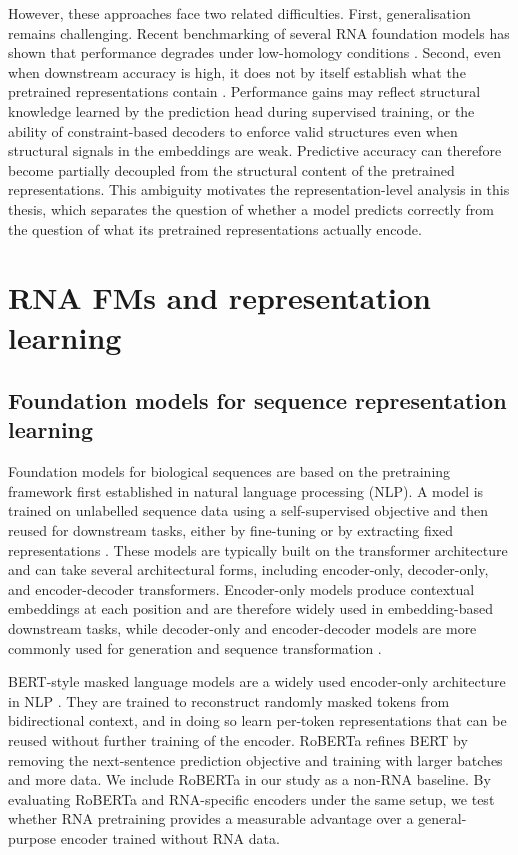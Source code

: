 \documentclass[logo,bsc,singlespacing,parskip]{infthesis}
\begin{document}
However, these approaches face two related difficulties. First, 
generalisation remains challenging. Recent benchmarking of several 
RNA foundation models has shown that performance degrades under 
low-homology conditions \citep{zablocki2025benchmark}. Second, 
even when downstream accuracy is high, it does not by itself 
establish what the pretrained representations contain 
\citep{hewitt2019designing, belinkov2022probing}. Performance gains may reflect structural knowledge learned by the prediction head during supervised training, or the ability of constraint-based decoders to enforce valid structures even when structural signals in the embeddings are weak. Predictive accuracy can therefore become partially decoupled from the structural content of the pretrained representations. This ambiguity motivates the representation-level analysis in this thesis, which separates the question of whether a model predicts correctly from the question of what its pretrained representations actually encode.

\section{RNA FMs and representation learning}
\label{sec:bg_rna_fms}
\subsection{Foundation models for sequence representation learning}
Foundation models for biological sequences are based on the pretraining framework first established in natural language processing (NLP). A model is trained on unlabelled sequence data using a self-supervised objective and then reused for 
downstream tasks, either by fine-tuning or by extracting fixed 
representations \citep{devlin2019bert}. These models are typically 
built on the transformer architecture \citep{vaswani2017attention} and can take several architectural forms, including encoder-only, decoder-only, and encoder-decoder transformers. Encoder-only models produce contextual embeddings at each position and are therefore widely used in embedding-based downstream tasks, while decoder-only and encoder-decoder models
are more commonly used for generation and sequence transformation \citep{devlin2019bert,radford2019gpt2,raffel2020t5}.

BERT-style masked language models are a widely used encoder-only architecture in NLP \citep{devlin2019bert}. They are trained to reconstruct randomly masked tokens from bidirectional context, and in doing so learn per-token representations that can be reused without further training of the encoder. RoBERTa \citep{liu2019roberta} refines BERT by removing the next-sentence prediction objective and training with larger batches and more data. We include RoBERTa in our study as a non-RNA baseline. By evaluating RoBERTa and RNA-specific encoders under the same setup, we test whether RNA pretraining provides a measurable advantage over a general-purpose encoder trained without RNA data.
\end{document}
